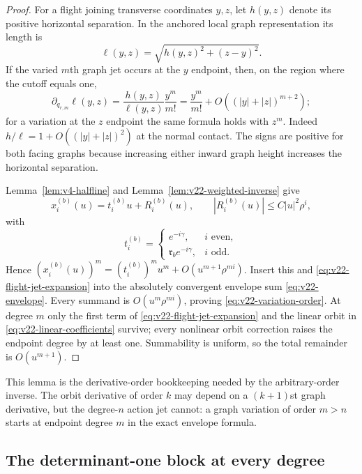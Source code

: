 \begin{proof}
For a flight joining transverse coordinates $y,z$, let $h(y,z)$ denote its
positive horizontal separation.  In the anchored local graph representation
its length is
\[
             \ell(y,z)=\sqrt{h(y,z)^2+(z-y)^2}.
\]
If the varied $m$th graph jet occurs at the $y$ endpoint, then, on the region
where the cutoff equals one,
\begin{equation}\label{eq:v22-flight-jet-expansion}
 \partial_{q_{r,m}}\ell(y,z)
 =\frac{h(y,z)}{\ell(y,z)}\frac{y^m}{m!}
 =\frac{y^m}{m!}+O((|y|+|z|)^{m+2});
\end{equation}
for a variation at the $z$ endpoint the same formula holds with $z^m$.
Indeed $h/\ell=1+O((|y|+|z|)^2)$ at the normal contact.  The signs are
positive for both facing graphs because increasing either inward graph height
increases the horizontal separation.

Lemma~\ref{lem:v4-halfline} and Lemma~\ref{lem:v22-weighted-inverse} give
\begin{equation}\label{eq:v22-linear-orbit-precise}
 x_i^{(b)}(u)=t_i^{(b)}u+R_i^{(b)}(u),
 \qquad |R_i^{(b)}(u)|\le C|u|^2\rho^i,
\end{equation}
with
\begin{equation}\label{eq:v22-linear-coefficients}
 t_i^{(b)}=
 \begin{cases}
 e^{-i\gamma},&i\text{ even},\\
 \mathfrak r_b e^{-i\gamma},&i\text{ odd}.
 \end{cases}
\end{equation}
Hence
$(x_i^{(b)}(u))^m=(t_i^{(b)})^mu^m+O(u^{m+1}\rho^{mi})$.
Insert this and \eqref{eq:v22-flight-jet-expansion} into the absolutely
convergent envelope sum \eqref{eq:v22-envelope}.  Every summand is
$O(u^m\rho^{mi})$, proving \eqref{eq:v22-variation-order}.  At degree $m$
only the first term of \eqref{eq:v22-flight-jet-expansion} and the linear
orbit in \eqref{eq:v22-linear-coefficients} survive; every nonlinear orbit
correction raises the endpoint degree by at least one.  Summability is
uniform, so the total remainder is $O(u^{m+1})$.
\end{proof}

This lemma is the derivative-order bookkeeping needed by the arbitrary-order
inverse.  The orbit derivative of order $k$ may depend on a $(k+1)$st graph
derivative, but the degree-$n$ action jet cannot: a graph variation of order
$m>n$ starts at endpoint degree $m$ in the exact envelope formula.

\subsection{The determinant-one block at every degree}

